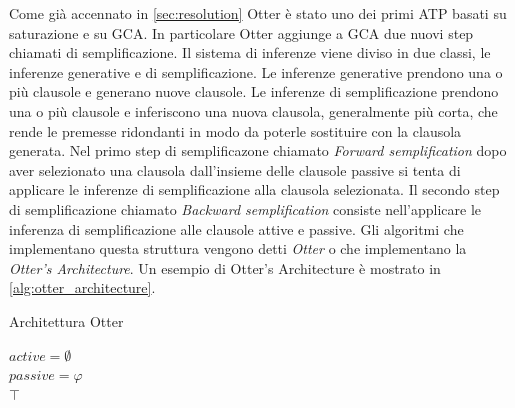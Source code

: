 \documentclass[./main.tex]{subfiles}
\begin{document}
Come già accennato in \ref{sec:resolution} Otter è stato uno dei primi ATP basati su saturazione e su GCA.
In particolare Otter aggiunge a GCA due nuovi step chiamati di semplificazione.
Il sistema di inferenze viene diviso in due classi, le inferenze generative e di semplificazione.
Le inferenze generative prendono una o più clausole e generano nuove clausole.
Le inferenze di semplificazione prendono una o più clausole e inferiscono 
una nuova clausola, generalmente più corta, che rende le premesse ridondanti in modo da poterle sostituire
con la clausola generata. 
Nel primo step di semplificazone chiamato \textit{Forward semplification} dopo aver selezionato una 
clausola dall'insieme delle clausole passive si tenta di applicare le inferenze di semplificazione
alla clausola selezionata. Il secondo step di semplificazione chiamato \textit{Backward semplification}
consiste nell'applicare le inferenza di semplificazione alle clausole attive e passive.
Gli algoritmi che implementano questa struttura vengono detti \textit{Otter} o che
implementano la \textit{Otter's Architecture}. Un esempio di Otter's Architecture è mostrato in \ref{alg:otter_architecture}.

\begin{algorithm}[H]
    \caption{Architettura Otter} \label{alg:otter_architecture}


    $active = \emptyset$ \\
    $passive = \varphi$ \\

    \Return $\top$\;    
\end{algorithm}
\end{document}
